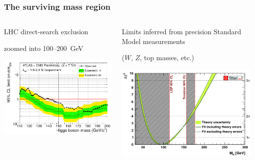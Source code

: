\documentclass[compress]{beamer}
\begin{document}
\begin{frame}
\frametitle{The surviving mass region}

\begin{columns}
\begin{center}
\vspace{0.25\baselineskip}
LHC direct-search exclusion

\vspace{0.25\baselineskip}
zoomed into 100--200~GeV

\vspace{0.5\baselineskip}
\includegraphics[width=\linewidth]{higgs_limits_zoom.png}
\end{center}

\begin{center}
Limits inferred from precision Standard Model measurements

($W$, $Z$, top masses, etc.)

\includegraphics[width=\linewidth]{higgs_limits_indirect.png}
\end{center}
\end{columns}


\end{frame}
\end{document}
